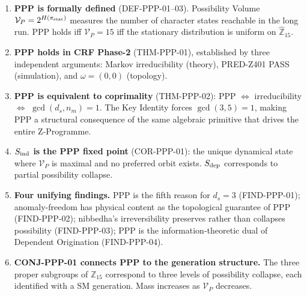 \documentclass[12pt, a4paper]{article}
\begin{document}
\begin{enumerate}[leftmargin=*]

\item \textbf{PPP is formally defined} (DEF-PPP-01--03). Possibility
  Volume $\mathcal{V}_P = 2^{H(\pi_{\rm stat})}$ measures the number
  of character states reachable in the long run. PPP holds iff
  $\mathcal{V}_P = 15$ iff the stationary distribution is uniform
  on $\hat{\mathbb{Z}}_{15}$.

\item \textbf{PPP holds in CRF Phase-2} (THM-PPP-01), established
  by three independent arguments: Markov irreducibility (theory),
  PRED-Z401 PASS (simulation), and $\omega = (0,0)$ (topology).

\item \textbf{PPP is equivalent to coprimality} (THM-PPP-02):
  PPP $\Leftrightarrow$ irreducibility $\Leftrightarrow$
  $\gcd(d_s, n_m) = 1$. The Key Identity forces $\gcd(3,5) = 1$,
  making PPP a structural consequence of the same algebraic
  primitive that drives the entire Z-Programme.

\item \textbf{$S_{\rm ind}$ is the PPP fixed point} (COR-PPP-01):
  the unique dynamical state where $\mathcal{V}_P$ is maximal and
  no preferred orbit exists. $S_{\rm dep}$ corresponds to partial
  possibility collapse.

\item \textbf{Four unifying findings.} PPP is the fifth reason
  for $d_s = 3$ (FIND-PPP-01); anomaly-freedom has physical content
  as the topological guarantee of PPP (FIND-PPP-02); nibbedha's
  irreversibility preserves rather than collapses possibility
  (FIND-PPP-03); PPP is the information-theoretic dual of Dependent
  Origination (FIND-PPP-04).

\item \textbf{CONJ-PPP-01 connects PPP to the generation structure.}
  The three proper subgroups of $\mathbb{Z}_{15}$ correspond to
  three levels of possibility collapse, each identified with a SM
  generation. Mass increases as $\mathcal{V}_P$ decreases.

\end{enumerate}
\end{document}
